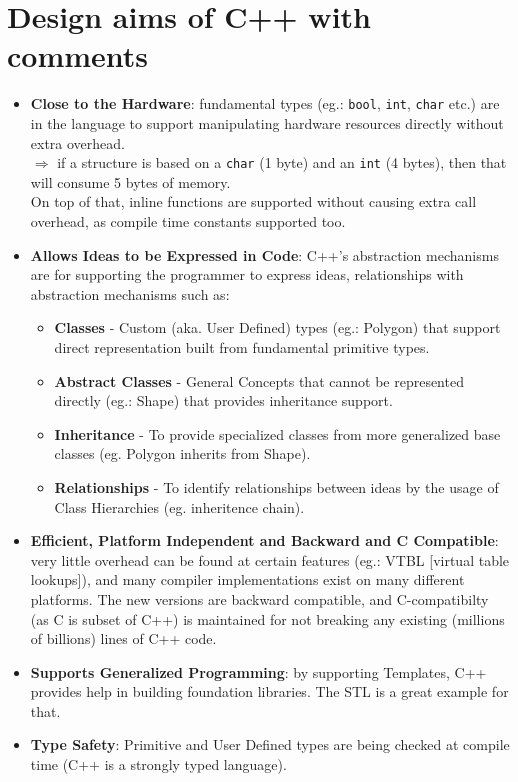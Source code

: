 \documentclass{article}
\begin{document}
 \section*{Design aims of C++ with comments}
 \begin{itemize}
  \item \textbf{Close to the Hardware}: fundamental types (eg.: \texttt{bool}, \texttt{int}, \texttt{char} etc.) 
  are in the language to support manipulating hardware resources directly without extra overhead.
  \\
  $\Rightarrow$ if a structure is based on a \texttt{char} (1 byte) and an \texttt{int} (4 bytes), then that will consume
  5 bytes of memory.
  \\
  On top of that, inline functions are supported without causing extra call overhead, as compile time constants supported too.
  \item \textbf{Allows Ideas to be Expressed in Code}: C++'s abstraction mechanisms are for supporting the 
  programmer to express ideas, relationships with abstraction mechanisms such as:
  \begin{itemize}
    \item \textbf{Classes} - Custom (aka. User Defined) types (eg.: Polygon) that support direct representation built from fundamental primitive types.
    \item \textbf{Abstract Classes} - General Concepts that cannot be represented directly (eg.: Shape) that provides inheritance support.
    \item \textbf{Inheritance} - To provide specialized classes from more generalized base classes (eg. Polygon inherits from Shape).
    \item \textbf{Relationships} - To identify relationships between ideas by the usage of Class Hierarchies (eg. inheritence chain).
  \end{itemize}
 \item \textbf{Efficient, Platform Independent and Backward and C Compatible}: very little overhead can be found at certain features (eg.: VTBL [virtual table lookups]),
 and many compiler implementations exist on many different platforms. The new versions are backward compatible,
 and C-compatibilty (as C is subset of C++) is maintained for not breaking any existing (millions of billions) lines of C++ code.
 \item \textbf{Supports Generalized Programming}: by supporting Templates, C++ provides help in building foundation libraries. The STL is a great example for that.
 \item \textbf{Type Safety}: Primitive and User Defined types are being checked at compile time (C++ is a strongly typed language).
 \end{itemize}
\end{document}
